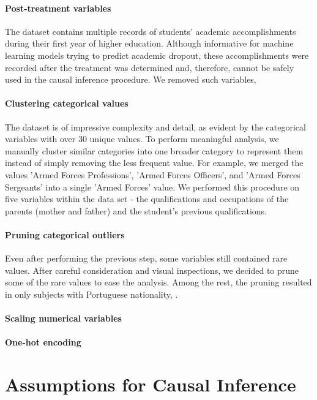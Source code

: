 \documentclass[11pt]{article}
\newcommand{\todo}[1]{{\color{orange}{TODO: #1}}}
\newcommand{\gur}[1]{{\color{teal}{Gur: #1}}}
\begin{document}
\paragraph{Post-treatment variables} The dataset contains multiple records of students' academic accomplishments during their first year of higher education. Although informative for machine learning models trying to predict academic dropout, these accomplishments were recorded after the treatment was determined and, therefore, cannot be safely used in the causal inference procedure. We removed such variables, 

\paragraph{Clustering categorical values} The dataset is of impressive complexity and detail, as evident by the categorical variables with over 30 unique values. To perform meaningful analysis, we manually cluster similar categories into one broader category to represent them instead of simply removing the less frequent value. For example, we merged the values 'Armed Forces Professions', 'Armed Forces Officers', and 'Armed Forces Sergeants' into a single 'Armed Forces' value. We performed this procedure on five variables within the data set - the qualifications and occupations of the parents (mother and father) and the student's previous qualifications. 

\paragraph{Pruning categorical outliers} Even after performing the previous step, some variables still contained rare values. After careful consideration and visual inspections, we decided to prune some of the rare values to ease the analysis. Among the rest, the pruning resulted in only subjects with Portuguese nationality, \gur{detail here more}.

\paragraph{Scaling numerical variables} \todo{Add this step.}

\paragraph{One-hot encoding} \todo{Add this step.}

\section{Assumptions for Causal Inference}
\end{document}
